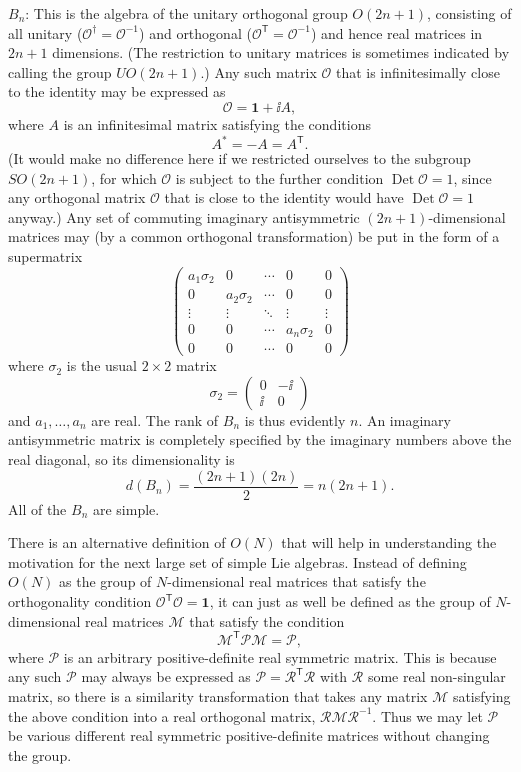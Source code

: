 \noindent
$B_n$: This is the algebra of the unitary orthogonal group $O(2n+1)$, consisting
of all unitary ($\mathcal O^\dagger=\mathcal O^{-1}$) and orthogonal
($\mathcal O^{\mathsf T}=\mathcal O^{-1}$) and hence real matrices in $2n+1$ dimensions.
(The restriction to unitary matrices is sometimes indicated by calling the group
$UO(2n+1)$.) Any such matrix $\mathcal O$ that is infinitesimally close to the
identity may be expressed as
\[
 \mathcal O=\mathbf{1}+\ii A ,
\]
where $A$ is an infinitesimal matrix satisfying the conditions
\[
 A^*=-A=A^{\mathsf T} .
\]
(It would make no difference here if we restricted ourselves to the subgroup
$SO(2n+1)$, for which $\mathcal O$ is subject to the further condition
$\operatorname{Det}\mathcal O=1$, since any orthogonal matrix $\mathcal O$ that
is close to the identity would have $\operatorname{Det}\mathcal O=1$ anyway.)
Any set of commuting imaginary antisymmetric $(2n+1)$-dimensional matrices may
(by a common orthogonal transformation) be put in the form of a supermatrix
\[
 \begin{pmatrix}
  a_1\sigma_2&0&\cdots&0&0\\
  0&a_2\sigma_2&\cdots&0&0\\
  \vdots&\vdots&\ddots&\vdots&\vdots\\
  0&0&\cdots&a_n\sigma_2&0\\
  0&0&\cdots&0&0
 \end{pmatrix}
\]
where $\sigma_2$ is the usual $2\times2$ matrix
\[
 \sigma_2=\begin{pmatrix}0&-\ii\\\ii&0\end{pmatrix}
\]
and $a_1,\ldots,a_n$ are real. The rank of $B_n$ is thus evidently $n$. An
imaginary antisymmetric matrix is completely specified by the imaginary numbers
above the real diagonal, so its dimensionality is
\[
 d(B_n)=\frac{(2n+1)(2n)}{2}=n(2n+1) .
\]
All of the $B_n$ are simple.

There is an alternative definition of $O(N)$ that will help in understanding the
motivation for the next large set of simple Lie algebras. Instead of defining
$O(N)$ as the group of $N$-dimensional real matrices that satisfy the
orthogonality condition $\mathcal O^{\mathsf T}\mathcal O=\mathbf{1}$, it can just as well
be defined as the group of $N$-dimensional real matrices $\mathcal M$ that satisfy
the condition
\[
 \mathcal M^{\mathsf T}\mathcal P\mathcal M=\mathcal P ,
\]
where $\mathcal P$ is an arbitrary positive-definite real symmetric matrix. This
is because any such $\mathcal P$ may always be expressed as
$\mathcal P=\mathcal R^{\mathsf T}\mathcal R$ with $\mathcal R$ some real non-singular
matrix, so there is a similarity transformation that takes any matrix $\mathcal M$
satisfying the above condition into a real orthogonal matrix,
$\mathcal R\mathcal M\mathcal R^{-1}$. Thus we may let $\mathcal P$ be various
different real symmetric positive-definite matrices without changing the group.

